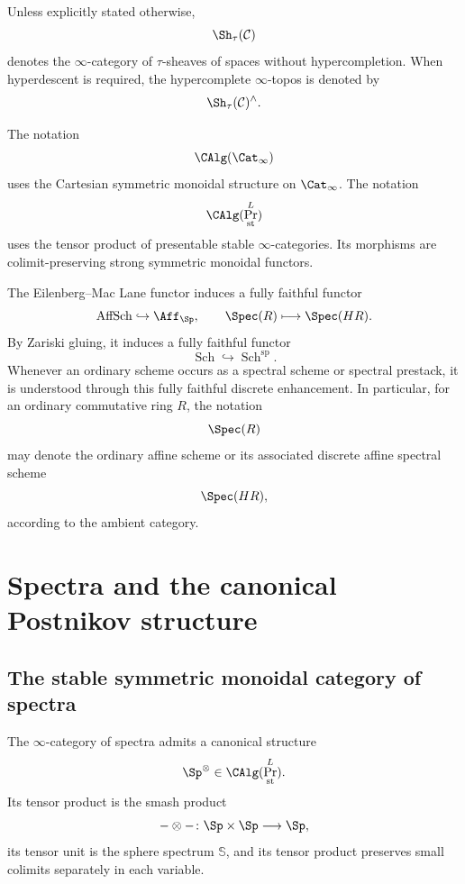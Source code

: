 \begin{convention}
\label{conv:spectral-sheaves-hyperdescent}
Unless explicitly stated otherwise,
\[
    \Sh_\tau(\mathcal C)
\]
denotes the $\infty$-category of $\tau$-sheaves of spaces without
hypercompletion. When hyperdescent is required, the hypercomplete
$\infty$-topos is denoted by
\[
    \Sh_\tau(\mathcal C)^\wedge.
\]
\end{convention}

\begin{convention}
\label{conv:spectral-monoidal-structures-on-categories}
The notation
\[
    \CAlg(\Cat_\infty)
\]
uses the Cartesian symmetric monoidal structure on $\Cat_\infty$.
The notation
\[
    \CAlg(\Pr^L_{\mathrm{st}})
\]
uses the tensor product of presentable stable $\infty$-categories. Its
morphisms are colimit-preserving strong symmetric monoidal functors.
\end{convention}

\begin{convention}
\label{conv:ordinary-schemes-as-spectral-schemes}
The Eilenberg--Mac Lane functor induces a fully faithful functor
\[
    \operatorname{AffSch}
    \hookrightarrow
    \Aff_{\Sp},
    \qquad
    \Spec(R)
    \longmapsto
    \Spec(HR).
\]
By Zariski gluing, it induces a fully faithful functor
\[
    \operatorname{Sch}
    \hookrightarrow
    \operatorname{Sch}^{\mathrm{sp}}.
\]
Whenever an ordinary scheme occurs as a spectral scheme or spectral
prestack, it is understood through this fully faithful discrete
enhancement. In particular, for an ordinary commutative ring \(R\), the
notation
\[
    \Spec(R)
\]
may denote the ordinary affine scheme or its associated discrete affine
spectral scheme
\[
    \Spec(HR),
\]
according to the ambient category.
\end{convention}

\section{Spectra and the canonical Postnikov structure}
\label{sec:spectra-postnikov-structure}

\subsection{The stable symmetric monoidal category of spectra}

\begin{proposition}
\label{prop:spectra-presentably-stable-monoidal}
The $\infty$-category of spectra admits a canonical structure
\[
    \Sp^\otimes
    \in
    \CAlg(\Pr^L_{\mathrm{st}}).
\]
Its tensor product is the smash product
\[
    -\otimes-
    \colon
    \Sp\times\Sp
    \longrightarrow
    \Sp,
\]
its tensor unit is the sphere spectrum $\mathbb S$, and its tensor product
preserves small colimits separately in each variable.
\end{proposition}

